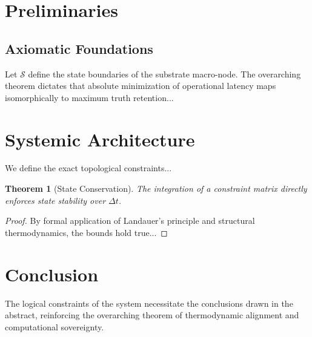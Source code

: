 \documentclass[12pt, a4paper]{article}
\theoremstyle{plain}
\newtheorem{theorem}{Theorem}[section]
\theoremstyle{definition}
\begin{document}
\section{Preliminaries}\label{sec:prelim}
\subsection{Axiomatic Foundations}
Let $\mathcal{S}$ define the state boundaries of the substrate macro-node. The overarching theorem dictates that absolute minimization of operational latency maps isomorphically to maximum truth retention...

\section{Systemic Architecture}\label{sec:architecture}
We define the exact topological constraints...
\begin{theorem}[State Conservation]\label{thm:conservation}
The integration of a constraint matrix directly enforces state stability over $\Delta t$.
\end{theorem}
\begin{proof}
By formal application of Landauer's principle and structural thermodynamics, the bounds hold true...
\end{proof}

\section{Conclusion}\label{sec:conclusion}
The logical constraints of the system necessitate the conclusions drawn in the abstract, reinforcing the overarching theorem of thermodynamic alignment and computational sovereignty.


\vspace{2em}
\noindent\hrulefill
\vspace{1em}
\end{document}
